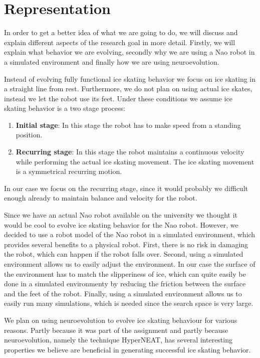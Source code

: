 \documentclass[10pt]{article}
\begin{document}
\section{Representation}
\label{sec:representation}
In order to get a better idea of what we are going to do, we will discuss and explain different aspects of the research goal in more detail. Firstly, we will explain what behavior we are evolving, secondly why we are using a Nao robot in a simulated environment and finally how we are using neuroevolution.

Instead of evolving fully functional ice skating behavior we focus on ice skating in a straight line from rest. Furthermore, we do not plan on using actual ice skates, instead we let the robot use its feet. Under these conditions we assume ice skating behavior is a two stage process:
\begin{enumerate}
	\item \textbf{Initial stage}: In this stage the robot has to make speed from a standing position.
	\item \textbf{Recurring stage}: In this stage the robot maintains a continuous velocity while performing the actual ice skating movement. The ice skating movement is a symmetrical recurring motion.
\end{enumerate}

In our case we focus on the recurring stage, since it would probably we difficult enough already to maintain balance and velocity for the robot.

Since we have an actual Nao robot available on the university we thought it would be cool to evolve ice skating behavior for the Nao robot. However, we decided to use a robot model of the Nao robot in a simulated environment, which provides several benefits to a physical robot. First, there is no risk in damaging the robot, which can happen if the robot falls over. Second, using a simulated environment allows us to easily adjust the environment. In our case the surface of the environment has to match the slipperiness of ice, which can quite easily be done in a simulated environmenty by reducing the friction between the surface and the feet of the robot. Finally, using a simulated environment allows us to easily run many simulations, which is needed since the search space is very large.

We plan on using neuroevolution to evolve ice skating behaviour for various reasons. Partly because it was part of the assignment and partly because neuroevolution, namely the technique HyperNEAT, has several interesting properties we believe are beneficial in generating successful ice skating behavior.
\end{document}

